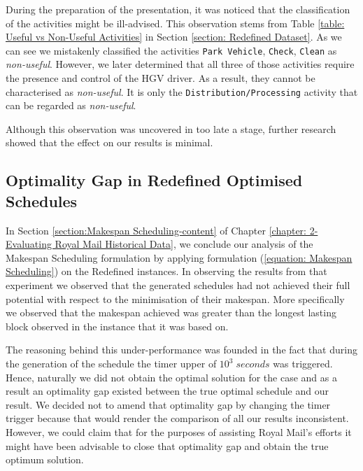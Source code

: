 \vspace{\baselineskip}
\noindent
During the preparation of the presentation, it was noticed that the classification of the activities might be ill-advised. This observation stems from Table \ref{table: Useful vs Non-Useful Activities} in Section \ref{section: Redefined Dataset}. As we can see we mistakenly classified the activities \texttt{Park Vehicle}, \texttt{Check}, \texttt{Clean} as \textit{non-useful}. However, we later determined that all three of those activities require the presence and control of the HGV driver. As a result, they cannot be characterised as \textit{non-useful}. It is only the \texttt{Distribution/Processing} activity that can be regarded as \textit{non-useful}.

\vspace{\baselineskip}
\noindent
Although this observation was uncovered in too late a stage, further research showed that the effect on our results is minimal. 

\subsection*{Optimality Gap in Redefined Optimised Schedules}
In Section \ref{section:Makespan Scheduling-content} of Chapter \ref{chapter: 2-Evaluating Royal Mail Historical Data}, we conclude our analysis of the Makespan Scheduling formulation by applying formulation (\ref{equation: Makespan Scheduling}) on the Redefined instances. In observing the results from that experiment we observed that the generated schedules had not achieved their full potential with respect to the minimisation of their makespan. More specifically we observed that the makespan achieved was greater than the longest lasting block observed in the instance that it was based on.

\vspace{\baselineskip}
\noindent
The reasoning behind this under-performance was founded in the fact that during the generation of the schedule the timer upper of $10^3 \; seconds$ was triggered. Hence, naturally we did not obtain the optimal solution for the case and as a result an optimality gap existed between the true optimal schedule and our result. We decided not to amend that optimality gap by changing the timer trigger because that would render the comparison of all our results inconsistent. However, we could claim that for the purposes of assisting Royal Mail's efforts it might have been advisable to close that optimality gap and obtain the true optimum solution.

